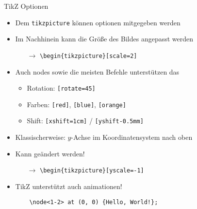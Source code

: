 \documentclass[main.tex]{subfiles}
\begin{document}
\begin{frame}[fragile]{TikZ Optionen}
    \begin{itemize}
        \item Dem \verb|tikzpicture| können optionen mitgegeben werden
        \pause
        \medskip
        \item Im Nachhinein kann die Größe des Bildes angepasst werden
        \begin{itemize}
            \item[$\to$] \verb|\begin{tikzpicture}[scale=2]|
        \end{itemize}
        \pause
        \medskip
        \item Auch nodes sowie die meisten Befehle unterstützen das
        \begin{itemize}
            \item Rotation: \texttt{[rotate=45]}
            \item Farben: \texttt{[red]}, \texttt{[blue]}, \texttt{[orange]}
            \item Shift: \texttt{[xshift=1cm]} / \texttt{[yshift-0.5mm]}
        \end{itemize}
        \pause
        \medskip
        \item Klassischerweise: $y$-Achse im Koordinatensystem nach oben
        \item Kann geändert werden!
        \begin{itemize}
            \item[$\to$] \verb|\begin{tikzpicture}[yscale=-1]|
        \end{itemize}
        \pause
        \medskip
        \item TikZ unterstützt auch animationen!
        \begin{verbatim}
    \node<1-2> at (0, 0) {Hello, World!};
        \end{verbatim}
    \end{itemize}
\end{frame}
\end{document}
